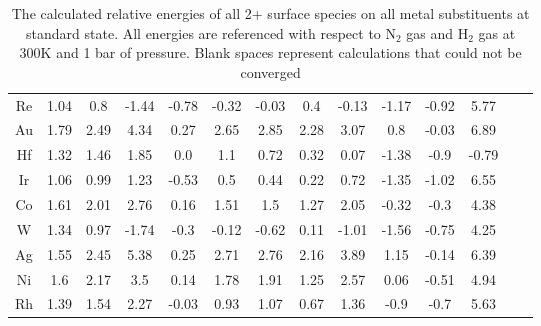 \documentclass{article}
\begin{document}
\begin{table}
\begin{center}
\begin{tabular}{| c | c | c | c | c | c | c | c | c | c | c | c | c | c |}
Re & 1.04 & 0.8 & -1.44 & -0.78 & -0.32 & -0.03 & 0.4 & -0.13 & -1.17 & -0.92 & 5.77 \\
Au & 1.79 & 2.49 & 4.34 & 0.27 & 2.65 & 2.85 & 2.28 & 3.07 & 0.8 & -0.03 & 6.89 \\
Hf & 1.32 & 1.46 & 1.85 & 0.0 & 1.1 & 0.72 & 0.32 & 0.07 & -1.38 & -0.9 & -0.79 \\
Ir & 1.06 & 0.99 & 1.23 & -0.53 & 0.5 & 0.44 & 0.22 & 0.72 & -1.35 & -1.02 & 6.55 \\
Co & 1.61 & 2.01 & 2.76 & 0.16 & 1.51 & 1.5 & 1.27 & 2.05 & -0.32 & -0.3 & 4.38 \\
W & 1.34 & 0.97 & -1.74 & -0.3 & -0.12 & -0.62 & 0.11 & -1.01 & -1.56 & -0.75 & 4.25 \\
Ag & 1.55 & 2.45 & 5.38 & 0.25 & 2.71 & 2.76 & 2.16 & 3.89 & 1.15 & -0.14 & 6.39 \\
Ni & 1.6 & 2.17 & 3.5 & 0.14 & 1.78 & 1.91 & 1.25 & 2.57 & 0.06 & -0.51 & 4.94 \\
Rh & 1.39 & 1.54 & 2.27 & -0.03 & 0.93 & 1.07 & 0.67 & 1.36 & -0.9 & -0.7 & 5.63 \\
\hline
\end{tabular}
\end{center}
\caption{The calculated relative energies of all 2+ surface species on all metal substituents at standard state. All energies are referenced with respect to N$_2$ gas and H$_2$ gas at 300K and 1 bar of pressure. Blank spaces represent calculations that could not be converged}
\label{table:energies}
\end{table}
\end{document}
